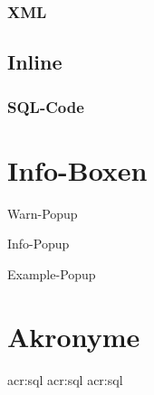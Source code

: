 \subsubsection{XML}

\subsection{Inline}

\subsubsection{SQL-Code}


\section{Info-Boxen}

\begin{warn-popup}
  Warn-Popup
\end{warn-popup}

\begin{info-popup}
  Info-Popup
\end{info-popup}

\begin{example-popup}
  Example-Popup
\end{example-popup}


\section{Akronyme}
\acrfull{acr:sql}
\acrlong{acr:sql}
\acrshort{acr:sql}


